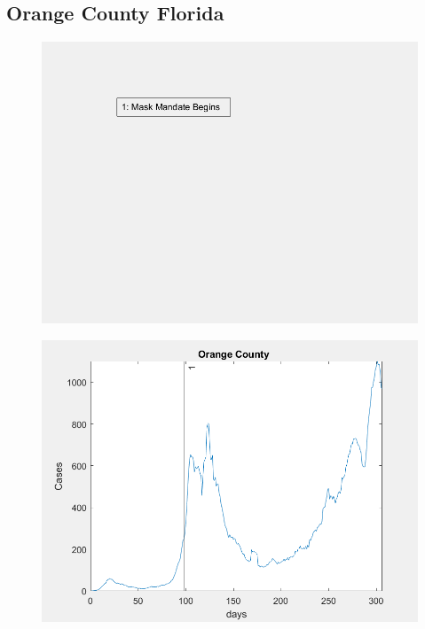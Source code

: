 \documentclass[12pt]{article}
\begin{document}
\FloatBarrier

\subsection[Subtitle]{\large Orange County Florida}

\begin{figure}[!h]
	\includegraphics[width=\linewidth]{legends/orange_mask_order_legend.png}
	\caption{}
	\label{fig:legends/orange_mask_order_legendLabel}
\end{figure}

\begin{figure}[!h]
	\includegraphics[width=\linewidth]{images/orange_mask_order.png}
	\caption{}
	\label{fig:images/orange_mask_orderLabel}
\end{figure}
\end{document}
